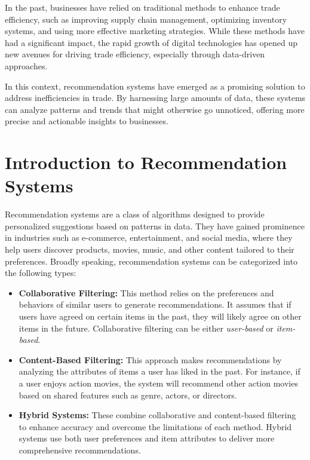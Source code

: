 \documentclass[10pt,twoside,slovak,a4paper]{article}
\begin{document}
\noindent In the past, businesses have relied on traditional methods to enhance trade efficiency, such as improving supply chain management, optimizing inventory systems, and using more effective marketing strategies. While these methods have had a significant impact, the rapid growth of digital technologies has opened up new avenues for driving trade efficiency, especially through data-driven approaches.

In this context, recommendation systems have emerged as a promising solution to address inefficiencies in trade. By harnessing large amounts of data, these systems can analyze patterns and trends that might otherwise go unnoticed, offering more precise and actionable insights to businesses.



\section{Introduction to Recommendation Systems}

Recommendation systems are a class of algorithms designed to provide personalized suggestions based on patterns in data. They have gained prominence in industries such as e-commerce, entertainment, and social media, where they help users discover products, movies, music, and other content tailored to their preferences. Broadly speaking, recommendation systems can be categorized into the following types:

\begin{itemize}
    \item \textbf{Collaborative Filtering:} This method relies on the preferences and behaviors of similar users to generate recommendations. It assumes that if users have agreed on certain items in the past, they will likely agree on other items in the future. Collaborative filtering can be either \textit{user-based} or \textit{item-based}.
    
    \item \textbf{Content-Based Filtering:} This approach makes recommendations by analyzing the attributes of items a user has liked in the past. For instance, if a user enjoys action movies, the system will recommend other action movies based on shared features such as genre, actors, or directors.
    
    \item \textbf{Hybrid Systems:} These combine collaborative and content-based filtering to enhance accuracy and overcome the limitations of each method. Hybrid systems use both user preferences and item attributes to deliver more comprehensive recommendations.
\end{itemize}
\end{document}
